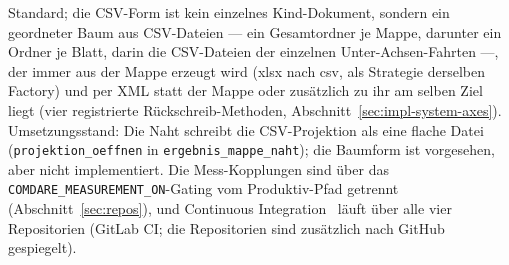 \begin{nurlang}
Standard; die CSV-Form ist kein einzelnes Kind-Dokument, sondern ein geordneter Baum aus CSV-Dateien ---
ein Gesamtordner je Mappe, darunter ein Ordner je Blatt, darin die CSV-Dateien der einzelnen
Unter-Achsen-Fahrten ---, der immer aus der Mappe erzeugt wird (xlsx nach csv, als Strategie derselben
Factory) und per XML statt der Mappe oder zusätzlich zu ihr am selben Ziel liegt (vier registrierte
Rückschreib-Methoden, Abschnitt~\ref{sec:impl-system-axes}). Umsetzungsstand: Die Naht schreibt die
CSV-Projektion als eine flache Datei (\texttt{projektion\_\allowbreak{}oeffnen} in
\texttt{ergebnis\_\allowbreak{}mappe\_\allowbreak{}naht}); die Baumform ist vorgesehen, aber nicht implementiert. Die
Mess-Kopplungen sind über das \texttt{COMDARE\_\allowbreak{}MEASUREMENT\_\allowbreak{}ON}-Gating vom
Produktiv-Pfad getrennt (Abschnitt~\ref{sec:repos}), und Continuous Integration~\cite{fowler2006ci} läuft
über alle vier Repositorien (GitLab CI\@; die Repositorien sind zusätzlich nach GitHub gespiegelt).
\begin{figure}[htbp]\centering
\end{figure}
\end{nurlang}
